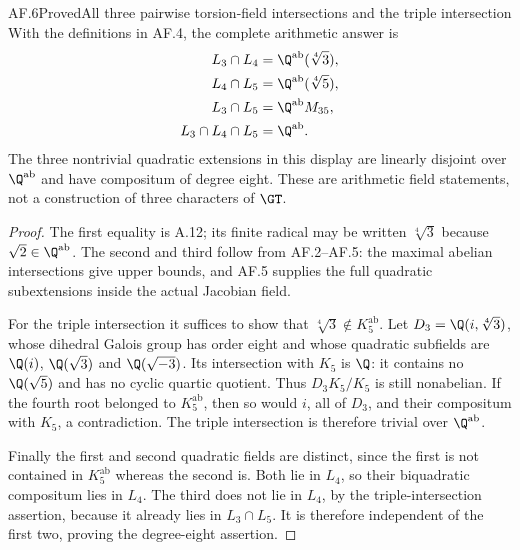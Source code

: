 \begin{statement}{AF.6}{Proved}{All three pairwise torsion-field intersections and the triple intersection}
With the definitions in AF.4, the complete arithmetic answer is
\[
\begin{aligned}
 L_3\cap L_4&=\Q^{\mathrm{ab}}(\sqrt[4]3),\\
 L_4\cap L_5&=\Q^{\mathrm{ab}}(\sqrt[4]5),\\
 L_3\cap L_5&=\Q^{\mathrm{ab}}M_{35},\\
 L_3\cap L_4\cap L_5&=\Q^{\mathrm{ab}}.
\end{aligned}
\]
The three nontrivial quadratic extensions in this display are
linearly disjoint over $\Q^{\mathrm{ab}}$ and have compositum
of degree eight. These are arithmetic field statements, not a
construction of three characters of $\GT$.
\end{statement}
\begin{proof}
The first equality is A.12; its finite radical may be written
$\sqrt[4]3$ because $\sqrt2\in\Q^{\mathrm{ab}}$.
The second and third follow from AF.2--AF.5: the maximal
abelian intersections give upper bounds, and AF.5 supplies the
full quadratic subextensions inside the actual Jacobian field.

For the triple intersection it suffices to show that
$\sqrt[4]3\notin K_5^{\mathrm{ab}}$. Let
$D_3=\Q(i,\sqrt[4]3)$, whose dihedral Galois group has order
eight and whose quadratic subfields are $\Q(i)$,
$\Q(\sqrt3)$ and $\Q(\sqrt{-3})$.
Its intersection with $K_5$ is $\Q$: it contains no
$\Q(\sqrt5)$ and has no cyclic quartic quotient.
Thus $D_3K_5/K_5$ is still nonabelian. If the fourth root
belonged to $K_5^{\mathrm{ab}}$, then so would $i$, all of
$D_3$, and their compositum with $K_5$, a contradiction.
The triple intersection is therefore trivial over
$\Q^{\mathrm{ab}}$.

Finally the first and second quadratic fields are distinct,
since the first is not contained in $K_5^{\mathrm{ab}}$ whereas
the second is. Both lie in $L_4$, so their biquadratic
compositum lies in $L_4$. The third does not lie in $L_4$,
by the triple-intersection assertion, because it already lies
in $L_3\cap L_5$. It is therefore independent of the first
two, proving the degree-eight assertion.
\end{proof}

